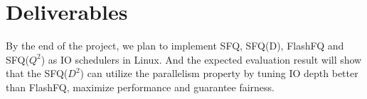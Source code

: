 \section{Deliverables}
By the end of the project, we plan to implement SFQ, SFQ(D), FlashFQ
and SFQ($Q^2$) as IO schedulers in Linux. And the expected evaluation
result will show that the SFQ($D^2$) can utilize the parallelism
property by tuning IO depth better than FlashFQ, maximize performance
and guarantee fairness.
